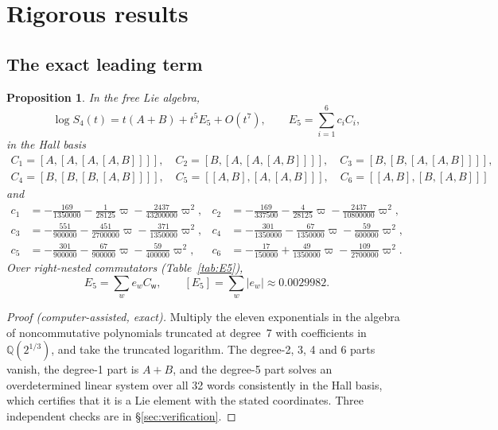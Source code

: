 \documentclass[11pt]{article}
\newcommand{\abs}[1]{\lvert #1\rvert}
\newcommand{\Qc}{\mathbb{Q}(2^{1/3})}
\newcommand{\C}[1]{C_{\mathsf{#1}}}
\newcommand{\lb}[1]{[#1]}
\theoremstyle{plain}
\newtheorem{proposition}{Proposition}
\theoremstyle{definition}
\theoremstyle{remark}
\begin{document}
\section{Rigorous results}\label{sec:rigorous}

\subsection{The exact leading term}

\begin{proposition}\label{prop:leading}
In the free Lie algebra,
\[
\log S_4(t)=t(A+B)+t^5E_5+O(t^7),\qquad E_5=\sum_{i=1}^6c_iC_i,
\]
in the Hall basis
\begin{gather*}
C_1=[A,[A,[A,[A,B]]]],\quad C_2=[B,[A,[A,[A,B]]]],\quad C_3=[B,[B,[A,[A,B]]]],\\
C_4=[B,[B,[B,[A,B]]]],\quad C_5=[[A,B],[A,[A,B]]],\quad C_6=[[A,B],[B,[A,B]]]
\end{gather*}
and
\[
\begin{aligned}
c_1&=-\tfrac{169}{1350000}-\tfrac{1}{28125}\varpi-\tfrac{2437}{43200000}\varpi^2,&
c_2&=-\tfrac{169}{337500}-\tfrac{4}{28125}\varpi-\tfrac{2437}{10800000}\varpi^2,\\
c_3&=-\tfrac{551}{900000}-\tfrac{451}{2700000}\varpi-\tfrac{371}{1350000}\varpi^2,&
c_4&=-\tfrac{301}{1350000}-\tfrac{67}{1350000}\varpi-\tfrac{59}{600000}\varpi^2,\\
c_5&=-\tfrac{301}{900000}-\tfrac{67}{900000}\varpi-\tfrac{59}{400000}\varpi^2,&
c_6&=-\tfrac{17}{150000}+\tfrac{49}{1350000}\varpi-\tfrac{109}{2700000}\varpi^2 .
\end{aligned}
\]
Over right-nested commutators (Table~\ref{tab:E5}),
\[
E_5=\sum_we_w\C w,\qquad \lb{E_5}=\sum_w\abs{e_w}\approx0.0029982 .
\]
\end{proposition}

\begin{proof}[Proof (computer-assisted, exact)]
Multiply the eleven exponentials in the algebra of noncommutative polynomials truncated at degree~7
with coefficients in $\Qc$, and take the truncated logarithm. The degree-2, 3, 4 and 6 parts vanish,
the degree-1 part is $A+B$, and the degree-5 part solves an overdetermined linear system over all 32
words consistently in the Hall basis, which certifies that it is a Lie element with the stated
coordinates. Three independent checks are in \S\ref{sec:verification}.
\end{proof}
\end{document}
